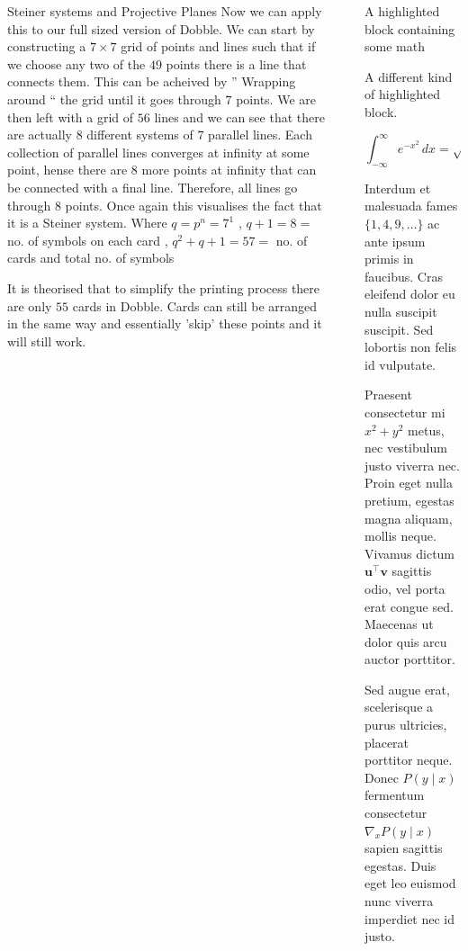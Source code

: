 \documentclass[final]{beamer}
\newlength{\sepwidth}
\newlength{\colwidth}
\newcommand{\separatorcolumn}{\begin{column}{\sepwidth}\end{column}}
\begin{document}
\begin{frame}[t]
\begin{columns}[t]
\begin{column}{\colwidth}
\begin{block}{Steiner systems and Projective Planes}
Now we can apply this to our full sized version of Dobble.
We can start by constructing a $7\times7$ grid of points and lines such that if we choose any two of the $49$ points there is a line that connects them. This can be acheived by '' Wrapping around `` the grid until it goes through $7$ points.
We are then left with a grid of $56$ lines and we can see that there are actually $8$ different systems of $7$ parallel lines. Each collection of parallel lines converges at infinity at some point,
hense there are $8$ more points at infinity that can be connected with a final line. Therefore, all lines go through $8$ points.
Once again this visualises the fact that it is a Steiner system. Where $q = p^n = 7^1$ , $q + 1 = 8 =$ no. of symbols on each card , $q^2 + q + 1 = 57 =$ no. of cards and total no. of symbols

It is theorised that to simplify the printing process there are only $55$ cards in Dobble. Cards can still be arranged in the same way and essentially 'skip' these points and it will still work. 

  \end{block}



\end{column}

\separatorcolumn

\begin{column}{\colwidth}

  \begin{exampleblock}{A highlighted block containing some math}

    A different kind of highlighted block.

    $$
    \int_{-\infty}^{\infty} e^{-x^2}\,dx = \sqrt{\pi}
    $$

    Interdum et malesuada fames $\{1, 4, 9, \ldots\}$ ac ante ipsum primis in
    faucibus. Cras eleifend dolor eu nulla suscipit suscipit. Sed lobortis non
    felis id vulputate.


    Praesent consectetur mi $x^2 + y^2$ metus, nec vestibulum justo viverra
    nec. Proin eget nulla pretium, egestas magna aliquam, mollis neque. Vivamus
    dictum $\mathbf{u}^\intercal\mathbf{v}$ sagittis odio, vel porta erat
    congue sed. Maecenas ut dolor quis arcu auctor porttitor.


    Sed augue erat, scelerisque a purus ultricies, placerat porttitor neque.
    Donec $P(y \mid x)$ fermentum consectetur $\nabla_x P(y \mid x)$ sapien
    sagittis egestas. Duis eget leo euismod nunc viverra imperdiet nec id
    justo.


\end{exampleblock}
\end{column}
\end{columns}
\end{frame}
\end{document}
